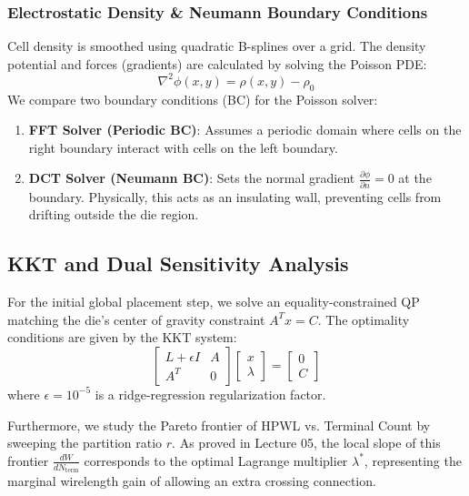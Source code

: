\documentclass[10pt, twocolumn]{article}
\begin{document}
\subsubsection{Electrostatic Density \& Neumann Boundary Conditions}
Cell density is smoothed using quadratic B-splines over a grid. The density potential and forces (gradients) are calculated by solving the Poisson PDE:
\begin{equation}
\nabla^2 \phi(x,y) = \rho(x,y) - \rho_0
\end{equation}
We compare two boundary conditions (BC) for the Poisson solver:
\begin{enumerate}
\item \textbf{FFT Solver (Periodic BC)}: Assumes a periodic domain where cells on the right boundary interact with cells on the left boundary.
\item \textbf{DCT Solver (Neumann BC)}: Sets the normal gradient $\frac{\partial \phi}{\partial n} = 0$ at the boundary. Physically, this acts as an insulating wall, preventing cells from drifting outside the die region.
\end{enumerate}

\subsection{KKT and Dual Sensitivity Analysis}
For the initial global placement step, we solve an equality-constrained QP matching the die's center of gravity constraint $A^T x = C$. The optimality conditions are given by the KKT system:
\begin{equation}
\begin{bmatrix} L + \epsilon I & A \\ A^T & 0 \end{bmatrix} \begin{bmatrix} x \\ \lambda \end{bmatrix} = \begin{bmatrix} 0 \\ C \end{bmatrix}
\end{equation}
where $\epsilon = 10^{-5}$ is a ridge-regression regularization factor. 

Furthermore, we study the Pareto frontier of HPWL vs. Terminal Count by sweeping the partition ratio $r$. As proved in Lecture 05, the local slope of this frontier $\frac{d W}{d N_{\text{term}}}$ corresponds to the optimal Lagrange multiplier $\lambda^*$, representing the marginal wirelength gain of allowing an extra crossing connection.
\end{document}
